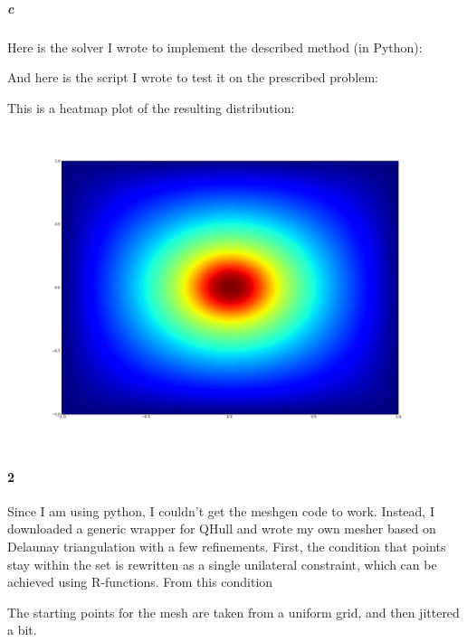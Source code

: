 \documentclass{article}
\begin{document}
\subparagraph{c}

Here is the solver I wrote to implement the described method (in Python):

\pagebreak


And here is the script I wrote to test it on the prescribed problem:



This is a heatmap plot of the resulting distribution:

\begin{center}
\includegraphics[width=5in]{prob1_result.png}
\end{center}

\paragraph{2}

Since I am using python, I couldn't get the meshgen code to work.  Instead, I downloaded a generic wrapper for QHull and wrote my own mesher based on Delaunay triangulation with a few refinements.  First, the condition that points stay within the set is rewritten as a single unilateral constraint, which can be achieved using R-functions.  From this condition

The starting points for the mesh are taken from a uniform grid, and then jittered a bit.  




\end{document}
